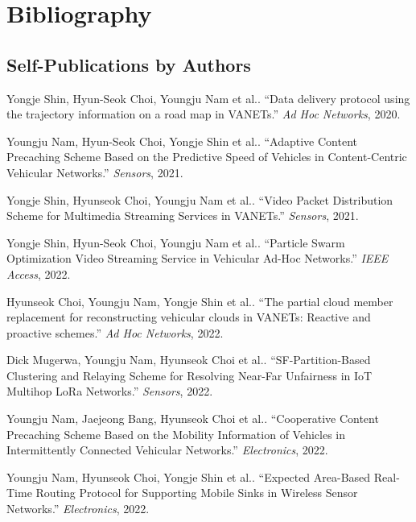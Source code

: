 \documentclass{article}
\begin{document}
\section*{Bibliography}


\subsection*{Self-Publications by Authors}

Yongje Shin, Hyun-Seok Choi, Youngju Nam et al.. ``Data delivery protocol using the trajectory information on a road map in VANETs.'' 
\textit{Ad Hoc Networks}, 2020.

Youngju Nam, Hyun-Seok Choi, Yongje Shin et al.. ``Adaptive Content Precaching Scheme Based on the Predictive Speed of Vehicles in Content-Centric Vehicular Networks.'' 
\textit{Sensors}, 2021.

Yongje Shin, Hyunseok Choi, Youngju Nam et al.. ``Video Packet Distribution Scheme for Multimedia Streaming Services in VANETs.'' 
\textit{Sensors}, 2021.

Yongje Shin, Hyun-Seok Choi, Youngju Nam et al.. ``Particle Swarm Optimization Video Streaming Service in Vehicular Ad-Hoc Networks.'' 
\textit{IEEE Access}, 2022.

Hyunseok Choi, Youngju Nam, Yongje Shin et al.. ``The partial cloud member replacement for reconstructing vehicular clouds in VANETs: Reactive and proactive schemes.'' 
\textit{Ad Hoc Networks}, 2022.

Dick Mugerwa, Youngju Nam, Hyunseok Choi et al.. ``SF-Partition-Based Clustering and Relaying Scheme for Resolving Near-Far Unfairness in IoT Multihop LoRa Networks.'' 
\textit{Sensors}, 2022.

Youngju Nam, Jaejeong Bang, Hyunseok Choi et al.. ``Cooperative Content Precaching Scheme Based on the Mobility Information of Vehicles in Intermittently Connected Vehicular Networks.'' 
\textit{Electronics}, 2022.

Youngju Nam, Hyunseok Choi, Yongje Shin et al.. ``Expected Area-Based Real-Time Routing Protocol for Supporting Mobile Sinks in Wireless Sensor Networks.'' 
\textit{Electronics}, 2022.
\end{document}
